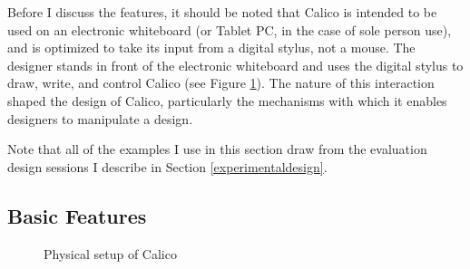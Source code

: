 \documentclass[12pt,fleqn]{ucithesis}
\begin{document}
Before I discuss the features, it should be noted that Calico is intended to be used on an electronic whiteboard (or Tablet PC, in the case of sole person use), and is optimized to take its input from a digital stylus, not a mouse. The designer stands in front of the electronic whiteboard and uses the digital stylus to draw, write, and control Calico (see Figure \ref{fig:2}). The nature of this interaction shaped the design of Calico, particularly the mechanisms with which it enables designers to manipulate a design.

Note that all of the examples I use in this section draw from the evaluation design sessions I describe in Section \ref{experimentaldesign}.

\subsection {Basic Features}
\label{calico:1}

\begin{figure}
  \centering

\caption {Physical setup of Calico}
\label{fig:2}       %
\end{figure}
%
\end{document}
